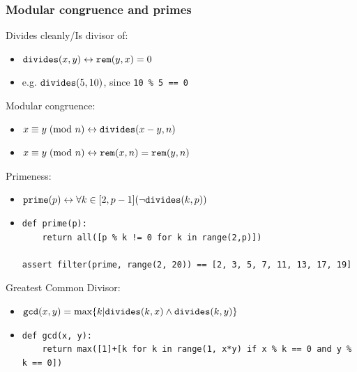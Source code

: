 \documentclass{beamer}
\begin{document}
\begin{frame}[fragile]
\frametitle{Modular congruence and primes}
Divides cleanly/Is divisor of:
\begin{itemize}
\item $\verb|divides|(x, y) \leftrightarrow \verb|rem|(y, x) = 0$
\item e.g. $\verb|divides|(5, 10)$, since \verb|10 % 5 == 0|
\end{itemize}
Modular congruence:
\begin{itemize}
\item $x \equiv y\hspace{1mm}(\text{mod } n) \leftrightarrow \verb|divides|(x-y, n)$
\item $x \equiv y\hspace{1mm}(\text{mod } n) \leftrightarrow \verb|rem|(x, n) = \verb|rem|(y, n)$
\end{itemize}
Primeness:
\begin{itemize}
\item $\verb|prime|(p) \leftrightarrow \forall k \in [2, p-1](\neg\verb|divides|(k, p))$
\item \begin{Verbatim}[fontsize=\tiny]
def prime(p):
    return all([p % k != 0 for k in range(2,p)])

assert filter(prime, range(2, 20)) == [2, 3, 5, 7, 11, 13, 17, 19]
\end{Verbatim}
\end{itemize}
Greatest Common Divisor:
\begin{itemize}
\item $\verb|gcd|(x, y) = \text{max}\{ k | \verb|divides|(k, x) \land \verb|divides|(k, y)\}$
\item \begin{Verbatim}[fontsize=\tiny]
def gcd(x, y):
    return max([1]+[k for k in range(1, x*y) if x % k == 0 and y % k == 0])
\end{Verbatim}
\end{itemize}
\end{frame}
\end{document}
